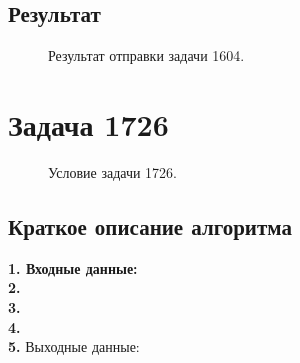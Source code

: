 \documentclass[a5paper, 10pt]{article}
\theoremstyle{definition}
\theoremstyle{plain}
\theoremstyle{remark}
\begin{document}
\subsection{Результат}
\begin{figure}[h]
\caption{Результат отправки задачи 1604.}
\end{figure}








\newpage


\section{Задача 1726}

\begin{figure}[h]
\caption{Условие задачи 1726.}
\end{figure}

\subsection{Краткое описание алгоритма}
\textbf{1. Входные данные:} \\
\textbf{2.}  \\
\textbf{3.}  \\
\textbf{4.}  \\
\textbf{5.} Выходные данные: 
\end{document}
